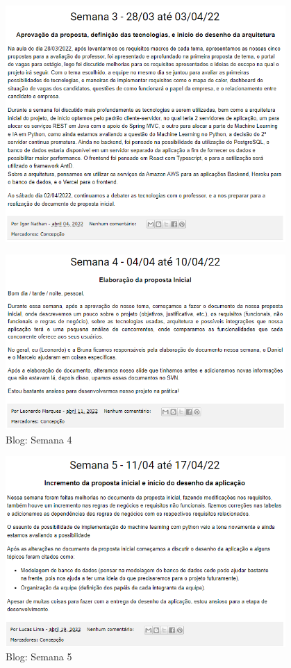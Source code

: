 \begin{apendicesenv}
\begin{figure}[H]
	\includegraphics[width=0.95\textwidth]{../imagens/blog-posts/semana03.png}
\end{figure}
\begin{figure}[H]
	\centering
	\caption{Blog: Semana 4}
	\includegraphics[width=0.95\textwidth]{../imagens/blog-posts/semana04.png}
\end{figure}
\begin{figure}[H]
	\centering
	\caption{Blog: Semana 5}
	\includegraphics[width=0.95\textwidth]{../imagens/blog-posts/semana05.png}

\end{figure}
\end{apendicesenv}
